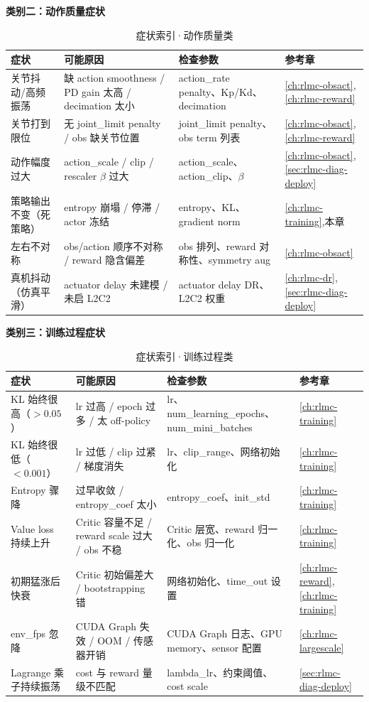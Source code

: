 \textbf{类别二：动作质量症状}

\begin{table}[H]
\centering
\caption{症状索引·动作质量类}
\label{tab:rlmc-diag-idx-action}
\begin{tabular}{p{3.6cm}p{3.8cm}p{3.2cm}p{2.0cm}}
\hline
症状 & 可能原因 & 检查参数 & 参考章 \\
\hline
关节抖动/高频振荡 & 缺 action smoothness / PD gain 太高 / decimation 太小 & action\_rate penalty、Kp/Kd、decimation & \cref{ch:rlmc-obsact},\cref{ch:rlmc-reward} \\
关节打到限位 & 无 joint\_limit penalty / obs 缺关节位置 & joint\_limit penalty、obs term 列表 & \cref{ch:rlmc-obsact},\cref{ch:rlmc-reward} \\
动作幅度过大 & action\_scale / clip / rescaler $\beta$ 过大 & action\_scale、action\_clip、$\beta$ & \cref{ch:rlmc-obsact},\cref{sec:rlmc-diag-deploy} \\
策略输出不变（死策略） & entropy 崩塌 / 停滞 / actor 冻结 & entropy、KL、gradient norm & \cref{ch:rlmc-training},本章 \\
左右不对称 & obs/action 顺序不对称 / reward 隐含偏差 & obs 排列、reward 对称性、symmetry aug & \cref{ch:rlmc-obsact} \\
真机抖动（仿真平滑） & actuator delay 未建模 / 未启 L2C2 & actuator delay DR、L2C2 权重 & \cref{ch:rlmc-dr},\cref{sec:rlmc-diag-deploy} \\
\hline
\end{tabular}
\end{table}

\textbf{类别三：训练过程症状}

\begin{table}[H]
\centering
\caption{症状索引·训练过程类}
\label{tab:rlmc-diag-idx-train}
\begin{tabular}{p{3.6cm}p{3.8cm}p{3.4cm}p{1.8cm}}
\hline
症状 & 可能原因 & 检查参数 & 参考章 \\
\hline
KL 始终很高（$>0.05$） & lr 过高 / epoch 过多 / 太 off-policy & lr、num\_learning\_epochs、num\_mini\_batches & \cref{ch:rlmc-training} \\
KL 始终很低（$<0.001$） & lr 过低 / clip 过紧 / 梯度消失 & lr、clip\_range、网络初始化 & \cref{ch:rlmc-training} \\
Entropy 骤降 & 过早收敛 / entropy\_coef 太小 & entropy\_coef、init\_std & \cref{ch:rlmc-training} \\
Value loss 持续上升 & Critic 容量不足 / reward scale 过大 / obs 不稳 & Critic 层宽、reward 归一化、obs 归一化 & \cref{ch:rlmc-training} \\
初期猛涨后快衰 & Critic 初始偏差大 / bootstrapping 错 & 网络初始化、time\_out 设置 & \cref{ch:rlmc-reward},\cref{ch:rlmc-training} \\
env\_fps 忽降 & CUDA Graph 失效 / OOM / 传感器开销 & CUDA Graph 日志、GPU memory、sensor 配置 & \cref{ch:rlmc-largescale} \\
Lagrange 乘子持续振荡 & cost 与 reward 量级不匹配 & lambda\_lr、约束阈值、cost scale & \cref{sec:rlmc-diag-deploy} \\
\hline
\end{tabular}
\end{table}

